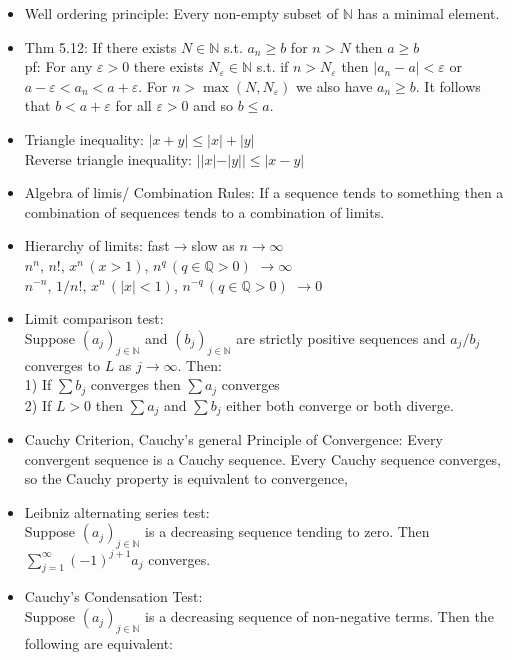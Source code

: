 \documentclass[10pt]{article}
\begin{document}
\begin{multicols}{2}
\begin{itemize}
    \item Well ordering principle: Every non-empty subset of $\mathbb{N}$ has a minimal element.
    \item Thm 5.12: If there exists $N\in\mathbb{N}$ s.t. $a_{n}\geq b$ for $n>N$ then $a\geq b$\\
    pf: For any $\varepsilon>0$ there exists $N_{\varepsilon}\in\mathbb{N}$ s.t. if $n>N_{\varepsilon}$ then $|a_{n}-a|<\varepsilon$ or $a-\varepsilon<a_{n}<a+\varepsilon$. For $n>\max(N,N_{\varepsilon})$ we also have $a_{n}\geq b$. It follows that $b<a+\varepsilon$ for all $\varepsilon>0$ and so $b\leq a$.
    \item Triangle inequality: $|x+y|\leq|x|+|y|$\\
    Reverse triangle inequality: $||x|-|y||\leq|x-y|$
    \item Algebra of limis/ Combination Rules: If a sequence tends to something then a combination of sequences tends to a combination of limits.
    \item Hierarchy of limits: fast$\to$slow as $n\to\infty$\\
    $n^{n}$, $n!$, $x^{n}\,(x>1)$, $n^{q}\,(q\in\mathbb{Q}>0)$ $\to\infty$\\
    $n^{-n}$, $1/n!$, $x^{n}\,(|x|<1)$, $n^{-q}\,(q\in\mathbb{Q}>0)$ $\to0$
    \item Limit comparison test:\\
    Suppose $(a_{j})_{j\in\mathbb{N}}$ and $(b_{j})_{j\in\mathbb{N}}$ are strictly positive sequences and $a_{j}/b_{j}$ converges to $L$ as $j\to\infty$. Then:\\
    1) If $\sum b_{j}$ converges then $\sum a_{j}$ converges\\
    2) If $L>0$ then $\sum a_{j}$ and $\sum b_{j}$ either both converge or both diverge.
    \item Cauchy Criterion, Cauchy's general Principle of Convergence: Every convergent sequence is a Cauchy sequence. Every Cauchy sequence converges, so the Cauchy property is equivalent to convergence, 
    \item Leibniz alternating series test:\\
    Suppose $(a_{j})_{j\in\mathbb{N}}$ is a decreasing sequence tending to zero. Then $\sum^{\infty}_{j=1}(-1)^{j+1}a_{j}$ converges.
    \item Cauchy's Condensation Test:\\
    Suppose $(a_{j})_{j\in\mathbb{N}}$ is a decreasing sequence of non-negative terms. Then the following are equivalent:\\

\end{itemize}
\end{multicols}
\end{document}
